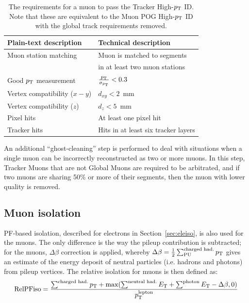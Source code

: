\begin{table}[h]
    \begin{small}
    \begin{center}
    \begin{tabular}{|l|l|}
      \hline
      Plain-text description         & Technical description                 \\
      \hline
      Muon station matching          & Muon is matched to segments           \\
                                     & in at least two muon stations         \\
      \hline                                                          
      Good $p_{\rm{T}}$ measurement         & $\frac{p_{\rm{T}}}{\sigma_{p_{\rm{T}}}} < 0.3$      \\
      \hline
      Vertex compatibility ($x-y$)   & $d_{xy} < 2$~mm                       \\
      \hline
      Vertex compatibility ($z$)     & $d_{z} < 5$~mm                        \\
      \hline
      Pixel hits                     & At least one pixel hit                \\
      \hline
      Tracker hits                   & Hits in at least six tracker layers   \\
      \hline
    \end{tabular}
    \caption{
      The requirements for a muon to pass the Tracker High-$p_{\rm{T}}$ ID. Note that
      these are equivalent to the Muon POG High-$p_{\rm{T}}$ ID with the global track 
      requirements removed.
      }
    \label{tab:highPtID}
    \end{center}
    \end{small}
\end{table}

An additional ``ghost-cleaning'' step is performed to deal with situations when a single muon
can be incorrectly reconstructed as two or more muons. In this step, Tracker Muons that are not Global Muons are required to be arbitrated, and if two muons are sharing 50\% or more of their segments, then the muon with lower quality is removed.

\subsection{Muon isolation}
\label{sec:muoniso}

PF-based isolation, described for electrons in Section~\ref{sec:eleiso}, is also used for the muons. 
The only difference is the way the pileup contribution is subtracted; for the muons, $\Delta\beta$ correction is applied, whereby $\Delta\beta = \frac{1}{2} \sum^\text{charged had.}_\text{PU} p_{\rm{T}}$  gives an estimate of the energy deposit of neutral particles (i.e. hadrons and photons) from pileup vertices. 
The relative isolation for muons is then defined as:
\begin{equation}
\text{RelPFiso} = \frac{\sum^\text{charged had.} p_{\rm{T}} + \max(\sum^\text{neutral had.} E_{\rm{T}} 
+ \sum^\text{photon} E_{\rm{T}} - \Delta \beta, 0)}{p_{\rm{T}}^\text{lepton}}
\label{eqn:mupfiso}
\end{equation}

